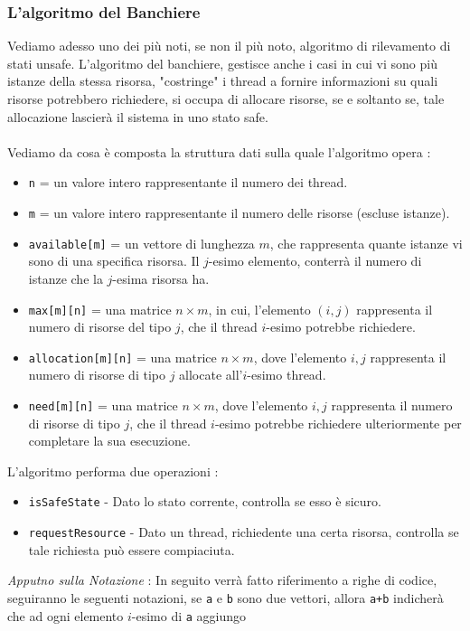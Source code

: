 \documentclass[12pt, letterpaper]{article}
\newcommand{\code}[1]{\colorbox{light-gray}{\texttt{#1}}}
\newcommand{\acc}{\\\hphantom{}\\}
\begin{document}
\subsubsection{L'algoritmo del Banchiere}
Vediamo adesso uno dei più noti, se non il più noto, algoritmo di rilevamento di stati unsafe. L'algoritmo del banchiere, 
gestisce anche i casi in cui vi sono più istanze della stessa risorsa, "costringe" i thread a fornire informazioni 
su quali risorse potrebbero richiedere, si occupa di allocare risorse, se e soltanto se, tale allocazione 
lascierà il sistema in uno stato safe.\acc 
Vediamo da cosa è composta la struttura dati sulla quale l'algoritmo opera : \begin{itemize}
    \item \code{n} = un valore intero rappresentante il numero dei thread.
    \item \code{m} = un valore intero rappresentante il numero delle risorse (escluse istanze).
    \item \code{available[m]} = un vettore di lunghezza \(m\), che rappresenta quante istanze vi sono di una specifica 
    risorsa. Il \(j\)-esimo elemento, conterrà il numero di istanze che la \(j\)-esima risorsa ha. 
    \item \code{max[m][n]} = una matrice \(n\times m\), in cui, l'elemento \((i,j)\) rappresenta 
    il numero di risorse del tipo \(j\), che il thread \(i\)-esimo potrebbe richiedere. 
    \item \code{allocation[m][n]} = una matrice \(n\times m\), dove l'elemento \(i,j\) rappresenta il numero di 
    risorse di tipo \(j\) allocate all'\(i\)-esimo thread.
    \item \code{need[m][n]} = una matrice \(n\times m\), dove l'elemento \(i,j\) rappresenta il numero di 
    risorse di tipo \(j\), che il thread \(i\)-esimo potrebbe richiedere ulteriormente per completare la sua 
    esecuzione.
\end{itemize}
L'algoritmo performa due operazioni : \begin{itemize}
    \item \code{isSafeState} - Dato lo stato corrente, controlla se esso è sicuro. 
    \item \code{requestResource} - Dato un thread, richiedente una certa risorsa, controlla se tale richiesta 
    può essere compiaciuta.
\end{itemize}
\textit{Apputno sulla Notazione }: In seguito verrà fatto riferimento a righe di codice, seguiranno le seguenti notazioni, se 
\code{a} e \code{b} sono due vettori, allora \code{a+b} indicherà che ad ogni elemento \(i\)-esimo di \code{a} aggiungo 
\end{document}
